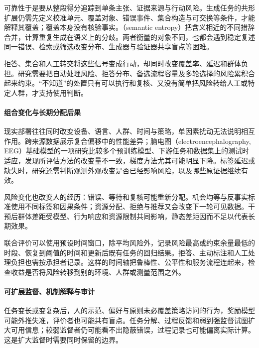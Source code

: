 可靠性于是要从整段得分追踪到单条主张、证据来源与行动风险。生成任务的共形扩展仍需先定义校准单元、覆盖对象、错误事件、集合构造与可交换等条件，才能解释其覆盖；覆盖本身没有核验事实。（semantic entropy）把含义相近的不同措辞合并，计算重复生成在语义上的分歧。两者衡量的对象不同，也都会遇到稳定复述同一错误、检索或筛选改变分布、生成器与验证器共享盲点等困难。

拒答、集合和人工转交将这些信号变成行动，却同时改变覆盖率、延迟和群体负担。研究需要把自动处理风险、拒答分布、备选流程容量及多轮选择的风险累积合起来约束。“不知道”的处置只有可以执行和复核、又没有简单把风险转给人工或特定人群，才支持使用判断。

\paragraph{组合变化与长期分配后果}

现实部署往往同时改变设备、语言、人群、时间与策略，单因素扰动无法说明相互作用。跨来源数据展示复合偏移中的性能差异；脑电图（electroencephalography, EEG）基础模型的一项研究比较多个预训练模型、下游任务和数据集上的测试时适应，发现所评估方法的改变量不一致，梯度方法尤其可能明显下降。标签延迟或缺失时，研究还需判断观测外观改变是否已经影响风险，以及哪些原证据继续有效。

风险变化也改变人的经历：错误、等待和复核可能重新分配。机会均等与反事实标准使用不同标签和因果条件；资源分配、拒绝与推荐又会改变下一轮可见数据。干预后群体差距受模型、行为响应和资源限制共同影响，静态差距因而不足以代表长期效果。

联合评价可以使用预设时间窗口，除平均风险外，记录风险最高或约束余量最低的时段、恢复到阈值的时间和更新后既有任务的回归结果。拒答、主动标注和人工处理负担也需按承担者记录。这样的时间轴把鲁棒性、公平性和服务流程连起来，检查收益是否将风险转移到别的环境、人群或测量范围之外。

\paragraph{可扩展监督、机制解释与审计}

任务变长或变复杂后，人的示范、偏好与原则未必覆盖策略访问的行为，奖励模型可能外推失准，评价者也可能共有盲点。任务分解、过程反馈和弱到强监督试图扩大可用信息；较弱监督者仍可能看不出隐蔽错误，过程记录也可能偏离实际计算。这是扩大监督时需要同时保留的边界。

